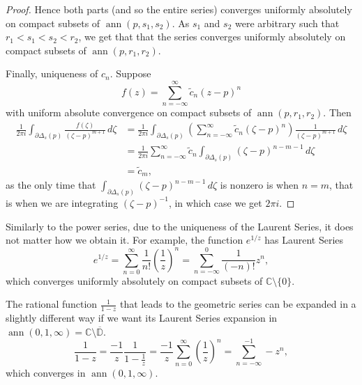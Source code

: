 \documentclass[12pt,openany]{book}
\newcommand{\ann}{\operatorname{ann}}
\newcommand{\C}{{\mathbb{C}}}
\newcommand{\D}{{\mathbb{D}}}
\theoremstyle{plain}
\theoremstyle{remark}
\theoremstyle{definition}
\theoremstyle{exercise}
\theoremstyle{example}
\begin{document}
\begin{proof}
Hence both parts (and so the entire series) 
converges uniformly absolutely on compact
subsets of $\ann(p,s_1,s_2)$.  As $s_1$ and $s_2$ were arbitrary such that
$r_1 < s_1 < s_2 < r_2$, we get that that the series
converges uniformly absolutely on compact subsets of $\ann(p,r_1,r_2)$.

Finally, uniqueness of $c_n$.  Suppose
\begin{equation*}
f(z)
=
\sum_{n=-\infty}^{\infty} \tilde{c}_n {(z-p)}^{n} 
\end{equation*}
with uniform absolute convergence on compact subsets of $\ann(p,r_1,r_2)$.
Then
\begin{equation*}
\begin{split}
\frac{1}{2\pi i}
\int_{\partial \Delta_{s}(p)} \frac{f(\zeta)}{{(\zeta-p)}^{m+1}}
 \, d\zeta 
& =
\frac{1}{2\pi i}
\int_{\partial \Delta_{s}(p)}
\left(\sum_{n=-\infty}^{\infty} \tilde{c}_n {(\zeta-p)}^{n} \right)
\frac{1}{{(\zeta-p)}^{m+1}}
 \, d\zeta 
\\
& =
\frac{1}{2\pi i}
\sum_{n=-\infty}^{\infty}
\tilde{c}_n
\int_{\partial \Delta_{s}(p)}
{(\zeta-p)}^{n-m-1}
 \, d\zeta 
\\
& =
\tilde{c}_m ,
\end{split}
\end{equation*}
as the only time that 
$\int_{\partial \Delta_{s}(p)}
{(\zeta-p)}^{n-m-1}
 \, d\zeta$ is nonzero is when $n=m$, that is when we are integrating
${(\zeta-p)}^{-1}$, in which case we get $2 \pi i$.
\end{proof}

Similarly to the power series, due to the uniqueness of the Laurent Series,
it does not matter how we obtain it.  For example, the function $e^{1/z}$
has Laurent Series
\begin{equation*}
e^{1/z}
=
\sum_{n=0}^{\infty} \frac{1}{n!} {\left(\frac{1}{z}\right)}^n
=
\sum_{n=-\infty}^0 \frac{1}{(-n)!} z^n ,
\end{equation*}
which converges uniformly absolutely on compact subsets of
$\C \setminus \{ 0 \}$.

The rational function $\frac{1}{1-z}$ that leads to the geometric series can
be expanded in a slightly different way if we want its Laurent Series
expansion in $\ann(0,1,\infty) = \C \setminus \overline{\D}$.
\begin{equation}
\frac{1}{1-z}
=
\frac{-1}{z}
\frac{1}{1-\frac{1}{z}}
=
\frac{-1}{z}
\sum_{n=0}^\infty
{\left(\frac{1}{z}\right)}^n
=
\sum_{n=-\infty}^{-1}
- z^{n} ,
\end{equation}
which converges in $\ann(0,1,\infty)$.
\end{document}
